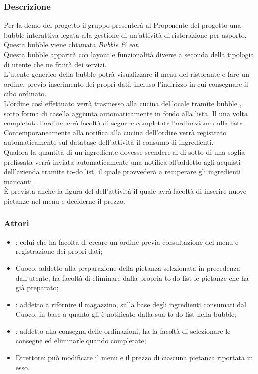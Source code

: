 \subsubsection{Descrizione}
Per la demo del progetto il gruppo \GroupName{} presenterà al Proponente del progetto una bubble interattiva legata alla gestione di un'attività di ristorazione per asporto. Questa bubble viene chiamata \textit{Bubble \& eat}.
\\Questa bubble apparirà con layout e funzionalità diverse a seconda della tipologia di utente che ne fruirà dei servizi.
\\L'utente generico della bubble potrà visualizzare il menu del ristorante e fare un ordine, previo inserimento dei propri dati, incluso l'indirizzo in cui consegnare il cibo ordinato.
\\L'ordine così effettuato verrà trasmesso alla cucina del locale tramite bubble , sotto forma di casella aggiunta automaticamente in fondo alla lista. Il  una volta completato l'ordine avrà facoltà di segnare completata l'ordinazione dalla lista.
\\Contemporaneamente alla notifica alla cucina dell'ordine verrà registrato automaticamente sul database dell'attività il consumo di ingredienti.
\\Qualora la quantità di un ingrediente dovesse scendere al di sotto di una soglia prefissata verrà inviata automaticamente una notifica all'addetto agli acquisti dell'azienda tramite to-do list, il quale provvederà a recuperare gli ingredienti mancanti.
\\È prevista anche la figura del  dell'attività il quale avrà facoltà di inserire nuove pietanze nel menu e deciderne il prezzo.

\subsubsection{Attori}
\begin{itemize}
	\item {}: colui che ha facoltà di creare un ordine previa consultazione del menu e registrazione dei propri dati;
	\item Cuoco: addetto alla preparazione della pietanza selezionata in precedenza dall'utente, ha facoltà di eliminare dalla propria to-do list le pietanze che ha già preparato;
	\item {}: addetto a rifornire il magazzino, sulla base degli ingredienti consumati dal Cuoco, in base a quanto gli è notificato dalla sua to-do list nella bubble;
	\item {}: addetto alla consegna delle ordinazioni, ha la facoltà di selezionare le consegne ed eliminarle quando completate;
	\item Direttore: può modificare il menu e il prezzo di ciascuna pietanza riportata in esso.
\end{itemize}

